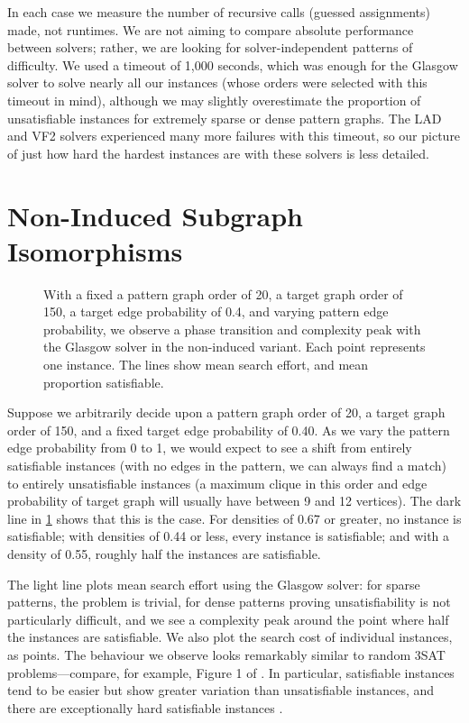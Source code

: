 \documentclass[letterpaper]{article}
\begin{document}
In each case we measure the number of recursive calls (guessed assignments) made, not runtimes. We
are not aiming to compare absolute performance between solvers; rather, we are looking for
solver-independent patterns of difficulty. We used a timeout of 1,000 seconds, which was enough for
the Glasgow solver to solve nearly all our instances (whose orders were selected with this timeout
in mind), although we may slightly overestimate the proportion of unsatisfiable instances for
extremely sparse or dense pattern graphs. The LAD and VF2 solvers experienced many more failures
with this timeout, so our picture of just how hard the hardest instances are with these solvers is
less detailed.

\section{Non-Induced Subgraph Isomorphisms}

\begin{figure}[tb]
    \setlength{\abovecaptionskip}{6pt}
    
    \caption{With a fixed a pattern graph order of 20, a target graph order of 150, a target edge
        probability of 0.4, and varying pattern edge probability, we observe a phase transition and
        complexity peak with the Glasgow solver in the non-induced variant. Each point represents
        one instance. The lines show mean search effort, and mean proportion satisfiable.}
    \label{figure:phase-transition}
\end{figure}

Suppose we arbitrarily decide upon a pattern graph order of 20, a target graph order of 150, and a
fixed target edge probability of 0.40. As we vary the pattern edge probability from 0 to 1, we would
expect to see a shift from entirely satisfiable instances (with no edges in the pattern, we can
always find a match) to entirely unsatisfiable instances (a maximum clique in this order and edge
probability of target graph will usually have between 9 and 12 vertices). The dark line in
\cref{figure:phase-transition} shows that this is the case. For densities of 0.67 or greater, no
instance is satisfiable; with densities of 0.44 or less, every instance is satisfiable; and with a
density of 0.55, roughly half the instances are satisfiable.

The light line plots mean search effort using the Glasgow solver: for sparse patterns, the problem
is trivial, for dense patterns proving unsatisfiability is not particularly difficult, and we see a
complexity peak around the point where half the instances are satisfiable.  We also plot the search
cost of individual instances, as points. The behaviour we observe looks remarkably similar to random
3SAT problems---compare, for example, Figure 1 of \citet{LeytonBrown:2014}. In particular,
satisfiable instances tend to be easier but show greater variation than unsatisfiable instances, and
there are exceptionally hard satisfiable instances \citep{Smith:1997}.
\end{document}
